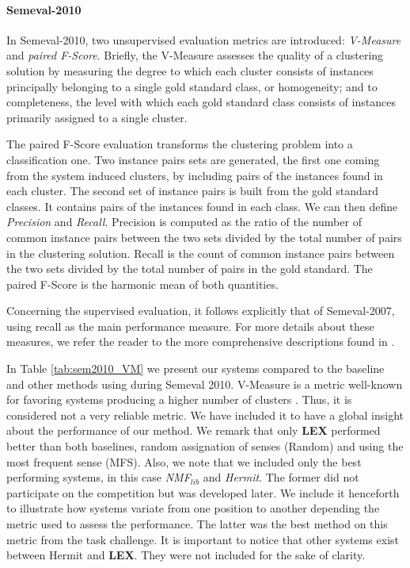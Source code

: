 \paragraph{Semeval-2010}
In Semeval-2010, two unsupervised evaluation metrics are introduced: \textit{V-Measure} and \textit{paired F-Score}. Briefly, the V-Measure assesses the quality of a clustering solution by measuring the degree to which each cluster consists of instances principally belonging to a single gold standard class, or homogeneity; and to completeness, the level with which each gold standard class consists of instances primarily assigned to a single cluster.

The paired F-Score evaluation transforms the clustering problem into a classification one. Two instance pairs sets are generated, the first one coming from the system induced clusters, by including pairs of the instances found in each cluster. The second set of instance pairs is built from the gold standard classes. It contains pairs of the instances found in each class. We can then define \textit{Precision} and \textit{Recall}. Precision is computed as the ratio of the number of common instance pairs between the two sets divided by the total number of pairs in the clustering solution. Recall is the count of common instance pairs between the two sets divided by the total number of pairs in the gold standard. The paired F-Score is the harmonic mean of both quantities.

Concerning the supervised evaluation, it follows explicitly that of Semeval-2007, using recall as the main performance measure. For more details about these measures, we refer the reader to the more comprehensive descriptions found in \cite{Semeval2010,VandeCruys2011,pedersen2010duluth}.


In Table \ref{tab:sem2010_VM} we present our systems compared to the baseline and other methods using during Semeval 2010. V-Measure is a metric well-known for favoring systems producing a higher number of clusters \cite{VandeCruys2011,pedersen2010duluth}. Thus, it is considered not a very reliable metric. We have included it to have a global insight about the performance of our method. We remark that only \textbf{LEX} performed better than both baselines, random assignation of senses (Random) and using the most frequent sense (MFS). Also, we note that we included only the best performing systems, in this case \textit{NMF$_{lib}$} and  \textit{Hermit}. The former  did not participate on the competition but was developed later. We include it henceforth to illustrate how systems variate from one position to another depending the metric used to assess the performance. The latter was the best method on this metric from the task challenge. It is important to notice that other systems exist between Hermit and \textbf{LEX}. They were not included for the sake of clarity.

